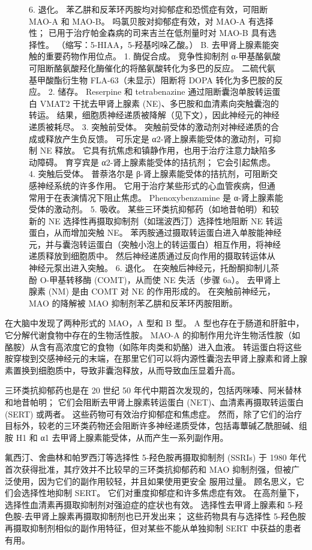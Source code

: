 \begin{figure}[htbp]
{	6. 退化。 苯乙肼和反苯环丙胺均对抑郁症和恐慌症有效，可阻断 MAO-A 和 MAO-B。 吗氯贝胺对抑郁症有效，对 MAO-A 有选择性； 已用于治疗帕金森病的司来吉兰在低剂量时对 MAO-B 具有选择性。 （缩写：5-HIAA，5-羟基吲哚乙酸。） B. 去甲肾上腺素能突触的重要药物作用位点。 1. 酶促合成。 竞争性抑制剂 α-甲基酪氨酸可阻断酪氨酸羟化酶催化的将酪氨酸转化为多巴的反应。 二硫代氨基甲酸酯衍生物 FLA-63（未显示）阻断将 DOPA 转化为多巴胺的反应。 2. 储存。 Reserpine 和 tetrabenazine 通过阻断囊泡单胺转运蛋白 VMAT2 干扰去甲肾上腺素 (NE)、多巴胺和血清素向突触囊泡的转运。 结果，细胞质神经递质被降解（见下文），因此神经元的神经递质被耗尽。 3. 突触前受体。 突触前受体的激动剂对神经递质的合成或释放产生负反馈。 可乐定是 α2-肾上腺素能受体的激动剂，可抑制 NE 释放。 它具有抗焦虑和镇静作用，也用于治疗注意力缺陷多动障碍。 育亨宾是 α2-肾上腺素能受体的拮抗剂； 它会引起焦虑。 4. 突触后受体。 普萘洛尔是 β-肾上腺素能受体的拮抗剂，可阻断交感神经系统的许多作用。 它用于治疗某些形式的心血管疾病，但通常用于在表演情况下阻止焦虑。 Phenoxybenzamine 是 α-肾上腺素能受体的激动剂。 5. 吸收。 某些三环类抗抑郁药（如地昔帕明）和较新的 NE 选择性再摄取抑制剂（如瑞波西汀）选择性地阻断 NE 转运蛋白，从而增加突触 NE。 苯丙胺通过摄取转运蛋白进入单胺能神经元，并与囊泡转运蛋白（突触小泡上的转运蛋白）相互作用，将神经递质释放到细胞质中。 然后神经递质通过反向作用的摄取转运体从神经元泵出进入突触。 6. 退化。 在突触后神经元，托酚酮抑制儿茶酚 O-甲基转移酶 (COMT)，从而使 NE 失活（步骤 6a）。 去甲肾上腺素 (NM) 是由 COMT 对 NE 的作用形成的。 在突触前神经元，MAO 的降解被 MAO 抑制剂苯乙肼和反苯环丙胺阻断。}
	\label{fig:61_7}
\end{figure}


在大脑中发现了两种形式的 MAO，A 型和 B 型。
A 型也存在于肠道和肝脏中，它分解代谢食物中存在的生物活性胺。
MAO-A 的抑制作用允许生物活性胺（如酪胺）从含有高浓度它的食物（如陈年肉类和奶酪）进入血液。
转运蛋白将这些胺穿梭到交感神经元的末端，在那里它们可以将内源性囊泡去甲肾上腺素和肾上腺素置换到细胞质中，导致非囊泡释放，从而导致血压显着升高。


三环类抗抑郁药也是在 20 世纪 50 年代中期首次发现的，包括丙咪嗪、阿米替林和地昔帕明；
它们会阻断去甲肾上腺素转运蛋白 (NET)、血清素再摄取转运蛋白 (SERT) 或两者。
这些药物可有效治疗抑郁症和焦虑症。
然而，除了它们的治疗目标外，较老的三环类药物还会阻断许多神经递质受体，包括毒蕈碱乙酰胆碱、组胺 H1 和 α1 去甲肾上腺素能受体，从而产生一系列副作用。


氟西汀、舍曲林和帕罗西汀等选择性 5-羟色胺再摄取抑制剂 (SSRIs) 于 1980 年代首次获得批准，其疗效并不比较早的三环类抗抑郁药和 MAO 抑制剂强，但被广泛使用，因为它们的副作用较轻，并且如果使用更安全 服用过量。
顾名思义，它们会选择性地抑制 SERT。 它们对重度抑郁症和许多焦虑症有效。
在高剂量下，选择性血清素再摄取抑制剂对强迫症的症状也有效。
选择性去甲肾上腺素和 5-羟色胺-去甲肾上腺素再摄取抑制剂也已开发出来；
这些药物具有与选择性 5-羟色胺再摄取抑制剂相似的副作用特征，但对某些不能从单独抑制 SERT 中获益的患者有用。



